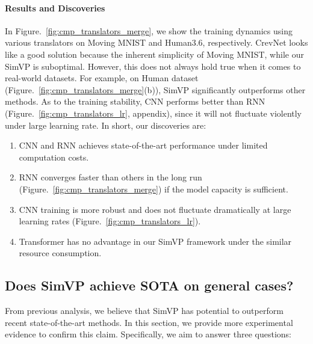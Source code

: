 \documentclass[10pt,twocolumn,letterpaper]{article}
\begin{document}
\vspace{-5mm}
\paragraph{Results and Discoveries} In Figure.~\ref{fig:cmp_translators_merge}, we show the training dynamics using various translators on Moving MNIST and Human3.6, respectively.  CrevNet looks like a good solution because the inherent simplicity of Moving MNIST, while our SimVP is suboptimal. However, this does not always hold true when it comes to real-world datasets. For example, on Human dataset (Figure.~\ref{fig:cmp_translators_merge}(b)), SimVP significantly outperforms other methods. As to the training stability, CNN performs better than RNN (Figure.~\ref{fig:cmp_translators_lr}, appendix), since it will not fluctuate violently under large learning rate. In short, our discoveries are:

\begin{enumerate}
  \item CNN and RNN achieves state-of-the-art performance under limited computation costs. 
  \setlength{\itemsep}{1pt}
  \setlength{\parsep}{1pt}
  \setlength{\parskip}{1pt}
  \item RNN converges faster than others in the long run (Figure.~\ref{fig:cmp_translators_merge}) if the model capacity is sufficient.

  \setlength{\itemsep}{1pt}
  \setlength{\parsep}{1pt}
  \setlength{\parskip}{1pt}
  \item CNN training is more robust and does not fluctuate dramatically at large learning rates (Figure.~\ref{fig:cmp_translators_lr}).

  \setlength{\itemsep}{1pt}
  \setlength{\parsep}{1pt}
  \setlength{\parskip}{1pt}
  \item Transformer has no advantage in our SimVP framework under the similar resource consumption.
\end{enumerate}










\subsection{Does SimVP achieve SOTA on general cases?}
From previous analysis, we believe that SimVP has potential to outperform recent state-of-the-art methods. In this section, we provide more experimental evidence to confirm this claim. Specifically, we aim to answer three questions:
\end{document}
